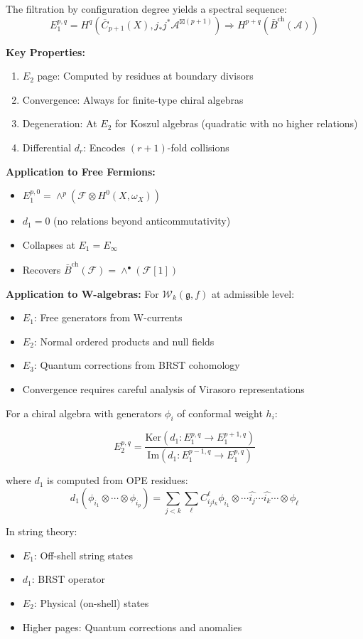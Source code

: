 \begin{theorem}
The filtration by configuration degree yields a spectral sequence:
$$E_1^{p,q} = H^q(\overline{C}_{p+1}(X), j_*j^*\mathcal{A}^{\boxtimes(p+1)}) \Rightarrow H^{p+q}(\bar{B}^{\text{ch}}(\mathcal{A}))$$

\textbf{Key Properties:}
\begin{enumerate}
\item $E_2$ page: Computed by residues at boundary divisors
\item Convergence: Always for finite-type chiral algebras
\item Degeneration: At $E_2$ for Koszul algebras (quadratic with no higher relations)
\item Differential $d_r$: Encodes $(r+1)$-fold collisions
\end{enumerate}

\textbf{Application to Free Fermions:}
\begin{itemize}
\item $E_1^{p,0} = \wedge^p(\mathcal{F} \otimes H^0(X, \omega_X))$ 
\item $d_1 = 0$ (no relations beyond anticommutativity)
\item Collapses at $E_1 = E_{\infty}$
\item Recovers $\bar{B}^{\text{ch}}(\mathcal{F}) = \wedge^{\bullet}(\mathcal{F}[1])$
\end{itemize}

\textbf{Application to W-algebras:}
For $\mathcal{W}_k(\mathfrak{g}, f)$ at admissible level:
\begin{itemize}
\item $E_1$: Free generators from W-currents
\item $E_2$: Normal ordered products and null fields
\item $E_3$: Quantum corrections from BRST cohomology
\item Convergence requires careful analysis of Virasoro representations
\end{itemize}
\end{theorem}

\begin{example}
For a chiral algebra with generators $\phi_i$ of conformal weight $h_i$:

$$E_2^{p,q} = \frac{\text{Ker}(d_1: E_1^{p,q} \to E_1^{p+1,q})}{\text{Im}(d_1: E_1^{p-1,q} \to E_1^{p,q})}$$

where $d_1$ is computed from OPE residues:
$$d_1(\phi_{i_1} \otimes \cdots \otimes \phi_{i_p}) = \sum_{j<k} \sum_\ell C_{i_j i_k}^\ell \phi_{i_1} \otimes \cdots \widehat{i_j} \cdots \widehat{i_k} \cdots \otimes \phi_\ell$$
\end{example}

\begin{remark}
In string theory:
\begin{itemize}
\item $E_1$: Off-shell string states
\item $d_1$: BRST operator
\item $E_2$: Physical (on-shell) states
\item Higher pages: Quantum corrections and anomalies
\end{itemize}
\end{remark}
